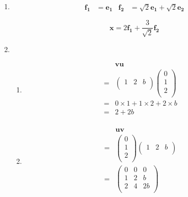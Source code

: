 \documentclass[10pt,oneside,a4paper]{article}
\begin{document}
\begin{enumerate}

\item 

\begin{align*}
\mathbf{f_1} &= \mathbf{e_1} & \mathbf{f_2} &= \sqrt{2}\mathbf{e_1} + \sqrt{2}\mathbf{e_2}
\end{align*}

\[
\mathbf{x} = 2\mathbf{f_1} + \frac{3}{\sqrt{2}}\mathbf{f_2}
\]

\item 

\begin{enumerate}

\item 

\[
\begin{split}
 & \mathbf{v}\mathbf{u} \\
=& \begin{pmatrix} 1 & 2 & b \\ \end{pmatrix} \begin{pmatrix} 0 \\ 1 \\ 2 \\ \end{pmatrix} \\
=& 0 \times 1 + 1 \times 2 + 2 \times b \\
=& 2 + 2b \\
\end{split}
\]

\item 

\[
\begin{split}
 & \mathbf{u}\mathbf{v} \\
=& \begin{pmatrix} 0 \\ 1 \\ 2 \\ \end{pmatrix} \begin{pmatrix} 1 & 2 & b \\ \end{pmatrix} \\
=& \begin{pmatrix} 0 & 0 & 0 \\ 1 & 2 & b \\ 2 & 4 & 2b \\ \end{pmatrix} \\
\end{split}
\]


\end{enumerate}
\end{enumerate}
\end{document}
